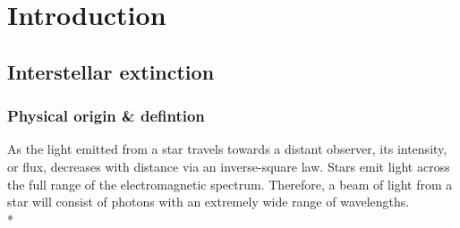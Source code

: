 \documentclass[12pt, a4paper]{report}
\begin{document}
\chapter{Introduction}
\section{Interstellar extinction} \label{ext_def}
\subsection{Physical origin \& defintion}
As the light emitted from a star travels towards a distant observer, its intensity, or flux, decreases with distance via an inverse-square law. Stars emit light across the full range of the electromagnetic spectrum. Therefore, a beam of light from a star will consist of photons with an extremely wide range of wavelengths. \\*




\end{document}
